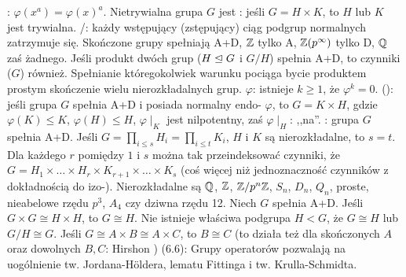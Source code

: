 :  $\varphi(x^a) = \varphi(x)^a$.
Nietrywialna grupa $G$ jest : jeśli $G = H \times K$, to $H$ lub $K$ jest trywialna.
/: każdy wstępujący (zstępujący) ciąg podgrup normalnych zatrzymuje się.
Skończone grupy spełniają A+D, $\mathbb{Z}$ tylko A, $\mathbb{Z}(p^\infty)$ tylko D, $\mathbb{Q}$ zaś żadnego.
Jeśli produkt dwóch grup ($H \trianglelefteq G$ i $G/H$) spełnia A+D, to czynniki ($G$) również.
Spełnianie któregokolwiek warunku pociąga bycie produktem prostym skończenie wielu nierozkładalnych grup.
 $\varphi$: istnieje $k \ge 1$, że $\varphi^k = 0$.
 (): jeśli grupa $G$ spełnia A+D i posiada normalny endo- $\varphi$, to $G = K \times H$, gdzie $\varphi(K) \le K$, $\varphi(H) \le H$, $\varphi \mid_K$ jest nilpotentny, zaś $\varphi \mid_H$: ,,na''.
: grupa $G$ spełnia A+D.
Jeśli $G = \prod_{i \le s} H_i = \prod_{i \le t} K_i$, $H$ i $K$ są nierozkładalne, to $s = t$.
Dla każdego $r$ pomiędzy $1$ i $s$ można tak przeindeksować czynniki, że $G = H_1 \times \ldots \times H_r \times K_{r+1} \times \ldots \times K_s$ (coś więcej niż jednoznaczność czynników z dokładnością do izo-).
Nierozkładalne są $\mathbb{Q}$, $\mathbb{Z}$, $\mathbb{Z}/p^n\mathbb{Z}$, $S_n$, $D_n$, $Q_n$, proste, nieabelowe rzędu $p^3$, $A_4$ czy dziwna rzędu 12.
Niech $G$ spełnia A+D.
Jeśli $G \times G \cong H \times H$, to $G \cong H$.
Nie istnieje właściwa podgrupa $H < G$, że $G \cong H$ lub $G/H \cong G$.
Jeśli $G \cong A \times B \cong A \times C$, to $B \cong C$ (to działa też dla skończonych $A$ oraz dowolnych $B, C$: Hirshon )
(6.6): Grupy operatorów pozwalają na uogólnienie tw. Jordana-Höldera, lematu Fittinga i tw. Krulla-Schmidta. %